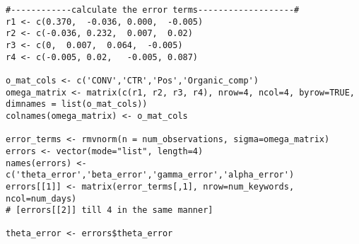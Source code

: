 \begin{lstlisting}[caption={Code for generating the error terms.}]
#------------calculate the error terms-------------------#
r1 <- c(0.370,	-0.036,	0.000,	-0.005)
r2 <- c(-0.036,	0.232,	0.007,	0.02)
r3 <- c(0,	0.007,	0.064,	-0.005)
r4 <- c(-0.005,	0.02,	-0.005,	0.087)

o_mat_cols <- c('CONV','CTR','Pos','Organic_comp')
omega_matrix <- matrix(c(r1, r2, r3, r4), nrow=4, ncol=4, byrow=TRUE, dimnames = list(o_mat_cols))
colnames(omega_matrix) <- o_mat_cols

error_terms <- rmvnorm(n = num_observations, sigma=omega_matrix)
errors <- vector(mode="list", length=4)
names(errors) <- c('theta_error','beta_error','gamma_error','alpha_error')
errors[[1]] <- matrix(error_terms[,1], nrow=num_keywords, ncol=num_days)
# [errors[[2]] till 4 in the same manner]

theta_error <- errors$theta_error
\end{lstlisting}